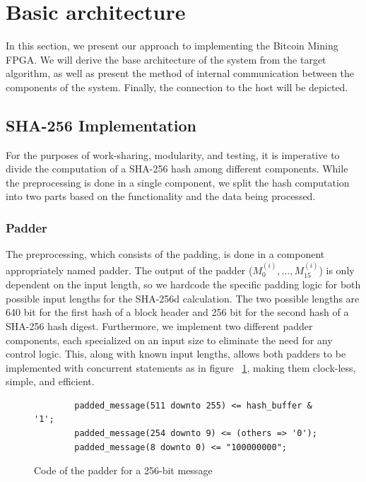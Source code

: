 \section{Basic architecture}
In this section, we present our approach to implementing the Bitcoin Mining FPGA. We will derive the base architecture of the system from the target algorithm, as well as present the method of internal communication between the components of the system. Finally, the connection to the host will be depicted.

\subsection{SHA-256 Implementation}
For the purposes of work-sharing, modularity, and testing, it is imperative to divide the computation of a SHA-256 hash among different components. While the preprocessing is done in a single component, we split the hash computation into two parts based on the functionality and the data being processed.

\subsubsection*{Padder}
The preprocessing, which consists of the padding, is done in a component appropriately named padder. The output of the padder ($M_0^{(i)},\dots,M_{15}^{(i)}$) is only dependent on the input length, so we hardcode the specific padding logic for both possible input lengths for the SHA-256d calculation. The two possible lengths are 640 bit for the first hash of a block header and 256 bit for the second hash of a SHA-256 hash digest. Furthermore, we implement two different padder components, each specialized on an input size to eliminate the need for any control logic. This, along with known input lengths, allows both padders to be implemented with concurrent statements as in figure~ \ref{code:padder}, making them clock-less, simple, and efficient.

\begin{figure}
    \begin{verbatim}
        padded_message(511 downto 255) <= hash_buffer & '1';
        padded_message(254 downto 9) <= (others => '0');
        padded_message(8 downto 0) <= "100000000";
    \end{verbatim}
    \centering
    \caption[Code of the padder for a 256-bit message]{Code of the padder for a 256-bit message}
    \label{code:padder}
\end{figure}

